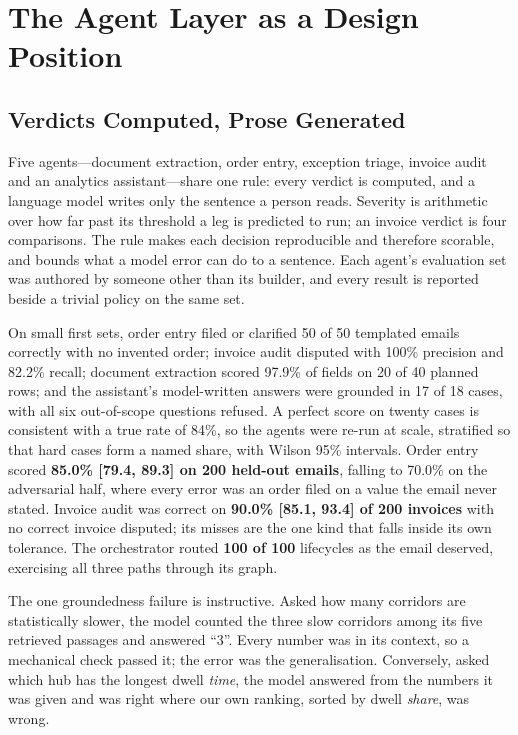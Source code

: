 \documentclass[conference]{IEEEtran}
\begin{document}
\section{The Agent Layer as a Design Position}

\subsection{Verdicts Computed, Prose Generated}
Five agents---document extraction, order entry, exception triage, invoice audit and an analytics assistant---share one rule: every verdict is computed, and a language model writes only the sentence a person reads. Severity is arithmetic over how far past its threshold a leg is predicted to run; an invoice verdict is four comparisons. The rule makes each decision reproducible and therefore scorable, and bounds what a model error can do to a sentence. Each agent's evaluation set was authored by someone other than its builder, and every result is reported beside a trivial policy on the same set.

On small first sets, order entry filed or clarified 50 of 50 templated emails correctly with no invented order; invoice audit disputed with 100\% precision and 82.2\% recall; document extraction scored 97.9\% of fields on 20 of 40 planned rows; and the assistant's model-written answers were grounded in 17 of 18 cases, with all six out-of-scope questions refused. A perfect score on twenty cases is consistent with a true rate of 84\%, so the agents were re-run at scale, stratified so that hard cases form a named share, with Wilson 95\% intervals. Order entry scored \textbf{85.0\% [79.4, 89.3] on 200 held-out emails}, falling to 70.0\% on the adversarial half, where every error was an order filed on a value the email never stated. Invoice audit was correct on \textbf{90.0\% [85.1, 93.4] of 200 invoices} with no correct invoice disputed; its misses are the one kind that falls inside its own tolerance. The orchestrator routed \textbf{100 of 100} lifecycles as the email deserved, exercising all three paths through its graph.

The one groundedness failure is instructive. Asked how many corridors are statistically slower, the model counted the three slow corridors among its five retrieved passages and answered ``3''. Every number was in its context, so a mechanical check passed it; the error was the generalisation. Conversely, asked which hub has the longest dwell \emph{time}, the model answered from the numbers it was given and was right where our own ranking, sorted by dwell \emph{share}, was wrong.
\end{document}
